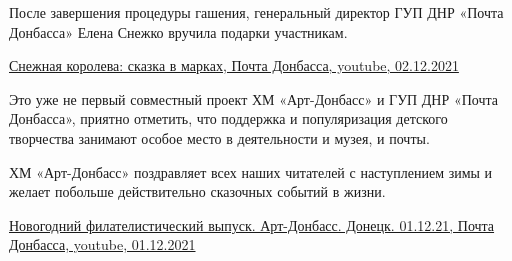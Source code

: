 
После завершения процедуры гашения, генеральный директор ГУП ДНР «Почта
Донбасса» Елена Снежко вручила подарки участникам.

\href{https://youtu.be/npAy2WA8mnI}{%
Снежная королева: сказка в марках, Почта Донбасса, youtube, 02.12.2021%
}


Это уже не первый совместный проект ХМ «Арт-Донбасс» и ГУП ДНР «Почта
Донбасса», приятно отметить, что поддержка и популяризация детского творчества
занимают особое место в деятельности и музея, и почты.

ХМ «Арт-Донбасс» поздравляет всех наших читателей с наступлением зимы и желает
побольше действительно сказочных событий в жизни.

\href{https://www.youtube.com/watch?v=B08b9o5x7t4}{%
Новогодний филателистический выпуск. Арт-Донбасс. Донецк. 01.12.21, Почта Донбасса, youtube, 01.12.2021%
}
